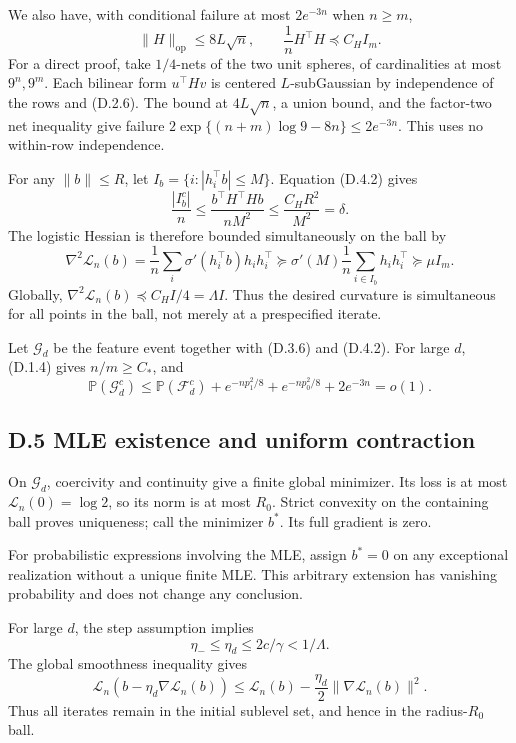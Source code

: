 \documentclass[
  11pt,
  a4paper,
]{article}
\begin{document}
We also have, with conditional failure at most \(2e^{-3n}\) when
\(n\geq m\), \[
\|H\|_{\mathrm{op}}\leq8L\sqrt n,
\qquad \frac1nH^\top H\preceq C_H I_m.
\tag{D.4.2}
\] For a direct proof, take \(1/4\)-nets of the two unit spheres, of
cardinalities at most \(9^n,9^m\). Each bilinear form \(u^\top Hv\) is
centered \(L\)-subGaussian by independence of the rows and (D.2.6). The
bound at \(4L\sqrt n\), a union bound, and the factor-two net inequality
give failure \(2\exp\{(n+m)\log9-8n\}\leq2e^{-3n}\). This uses no
within-row independence.

For any \(\|b\|\leq R\), let \(I_b=\{i:|h_i^\top b|\leq M\}\). Equation
(D.4.2) gives \[
\frac{|I_b^c|}{n}\leq\frac{b^\top H^\top Hb}{nM^2}
\leq\frac{C_HR^2}{M^2}=\delta.
\] The logistic Hessian is therefore bounded simultaneously on the ball
by \[
\nabla^2\mathcal L_n(b)
=\frac1n\sum_i\sigma'(h_i^\top b)h_ih_i^\top
\succeq\sigma'(M)\frac1n\sum_{i\in I_b}h_ih_i^\top
\succeq\mu I_m.
\tag{D.4.3}
\] Globally, \(\nabla^2\mathcal L_n(b)\preceq C_HI/4=\Lambda I\). Thus
the desired curvature is simultaneous for all points in the ball, not
merely at a prespecified iterate.

Let \(\mathcal G_d\) be the feature event together with (D.3.6) and
(D.4.2). For large \(d\), (D.1.4) gives \(n/m\geq C_*\), and \[
\mathbb P(\mathcal G_d^c)
\leq\mathbb P(\mathcal F_d^c)
 +e^{-np_1^2/8}+e^{-np_0^2/8}+2e^{-3n}=o(1).
\tag{D.4.4}
\]

\hypertarget{d.5-mle-existence-and-uniform-contraction}{%
\subsection{D.5 MLE existence and uniform
contraction}\label{d.5-mle-existence-and-uniform-contraction}}

On \(\mathcal G_d\), coercivity and continuity give a finite global
minimizer. Its loss is at most \(\mathcal L_n(0)=\log2\), so its norm is
at most \(R_0\). Strict convexity on the containing ball proves
uniqueness; call the minimizer \(b^*\). Its full gradient is zero.

For probabilistic expressions involving the MLE, assign \(b^*=0\) on any
exceptional realization without a unique finite MLE. This arbitrary
extension has vanishing probability and does not change any conclusion.

For large \(d\), the step assumption implies \[
\eta_-\leq\eta_d\leq2c/\gamma<1/\Lambda.
\tag{D.5.1}
\] The global smoothness inequality gives \[
\mathcal L_n(b-\eta_d\nabla\mathcal L_n(b))
\leq\mathcal L_n(b)-\frac{\eta_d}{2}\|\nabla\mathcal L_n(b)\|^2.
\tag{D.5.2}
\] Thus all iterates remain in the initial sublevel set, and hence in
the radius-\(R_0\) ball.
\end{document}
